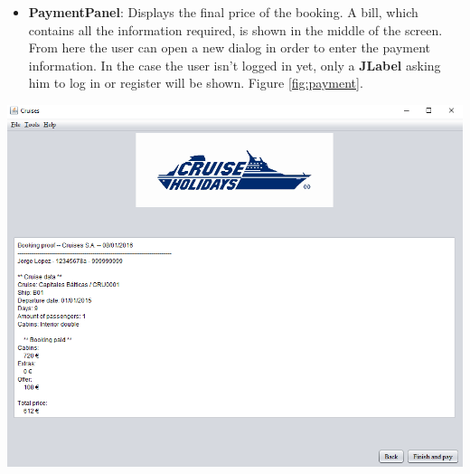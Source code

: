\documentclass[11pt]{article}
\begin{document}
    \begin{qn}
    	\begin{itemize}
	   	    \item \textbf{PaymentPanel}: Displays the final price of the booking. A bill, which contains all the information required, is shown in the middle of the screen. From here the user can open a new dialog in order to enter the payment information. In the case the user isn't logged in yet, only a \textbf{JLabel} asking him to log in or register will be shown. Figure \ref{fig:payment}.
   	    \end{itemize}
   	    \begin{center}
	   	    \begin{minipage}{0.8\linewidth}
		   	   	\includegraphics[width=\linewidth]{images/payment.png}
		   	   	\label{fig:payment}
	   	    \end{minipage}
   	    \end{center}
   	\end{qn}
   	
\end{document}
